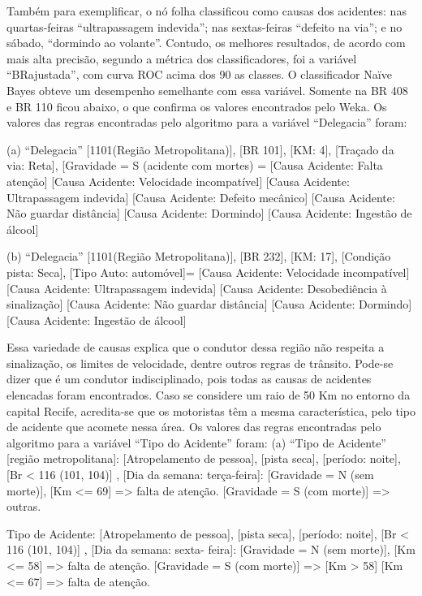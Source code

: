 \pagebreak


Também para exemplificar, o nó folha classificou como causas dos acidentes: nas
quartas-feiras “ultrapassagem indevida”; nas sextas-feiras
“defeito na via”; e no sábado, “dormindo ao volante”.
Contudo, os melhores resultados, de acordo com mais alta
precisão, segundo a métrica dos classificadores, foi a variável
“BRajustada”, com curva ROC acima dos 90%
as classes. O classificador Naïve Bayes obteve um
desempenho semelhante com essa
variável. Somente na BR 408 e BR 110 ficou abaixo, o que
confirma os valores encontrados pelo Weka.
Os valores das regras encontradas pelo algoritmo para a
variável “Delegacia” foram:

(a) “Delegacia” [1101(Região Metropolitana)], [BR 101],
[KM: 4], [Traçado da via: Reta], [Gravidade = S (acidente com
mortes) = 
[Causa Acidente: Falta atenção]
[Causa Acidente: Velocidade incompatível]
[Causa Acidente: Ultrapassagem indevida]
[Causa Acidente: Defeito mecânico]
[Causa Acidente: Não guardar distância]
[Causa Acidente: Dormindo]
[Causa Acidente: Ingestão de álcool]

(b) “Delegacia” [1101(Região Metropolitana)], [BR 232],
[KM: 17], [Condição pista: Seca], [Tipo Auto: automóvel]=
[Causa Acidente: Velocidade incompatível]
[Causa Acidente: Ultrapassagem indevida]
[Causa Acidente: Desobediência à sinalização]
[Causa Acidente: Não guardar distância]
[Causa Acidente: Dormindo]
[Causa Acidente: Ingestão de álcool]

Essa variedade de causas explica que o condutor dessa
região não respeita a sinalização, os limites de velocidade, dentre outros regras de trânsito. Pode-se dizer que é um condutor
indisciplinado, pois todas as causas de acidentes elencadas foram encontrados.
Caso se considere um raio de 50 Km no entorno da capital Recife, acredita-se que os motoristas têm a mesma
característica, pelo tipo de acidente que acomete nessa área.
Os valores das regras encontradas pelo algoritmo para a
variável “Tipo do Acidente” foram:
(a) “Tipo de Acidente” [região metropolitana]: [Atropelamento
de pessoa], [pista seca], [período: noite], [Br < 116 (101, 104)]
, [Dia da semana: terça-feira]:
[Gravidade = N (sem morte)], [Km <= 69] => falta de atenção.
[Gravidade = S (com morte)] => outras.

Tipo de Acidente: [Atropelamento de pessoa], [pista seca],
[período: noite], [Br < 116 (101, 104)] , [Dia da semana: sexta-
feira]:
[Gravidade = N (sem morte)], [Km <= 58] => falta de atenção.
[Gravidade = S (com morte)] => [Km > 58] [Km <= 67] =>
falta de atenção.

